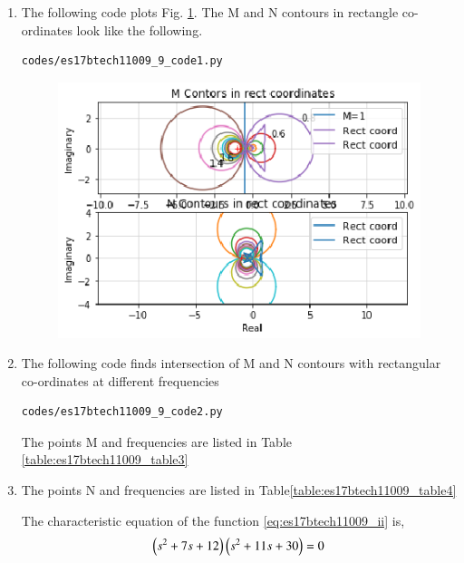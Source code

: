 \begin{enumerate}[label=\thesection.\arabic*.,ref=\thesection.\theenumi]
\begin{figure}[!h]
\end{figure}
\item
The following code plots Fig. \ref{fig:es17btech11009_9_1}.
The M and N contours in rectangle co-ordinates look like the following.
\begin{lstlisting}
codes/es17btech11009_9_code1.py
\end{lstlisting}
\begin{figure}[!h]
\includegraphics[width=\columnwidth]{./figs/es17btech11009_9_fig1.eps}
\caption{}
\label{fig:es17btech11009_9_1}
\end{figure}
\item 
The following code finds intersection of M and N contours with rectangular co-ordinates at different frequencies
\begin{lstlisting}
codes/es17btech11009_9_code2.py
\end{lstlisting}
The points M and frequencies are listed in Table  \ref{table:es17btech11009_table3}
\begin{table}[!ht]
\centering

\caption{}
\label{table:es17btech11009_table3}
\end{table}
\item
The points N and frequencies are listed in Table\ref{table:es17btech11009_table4}
\begin{table}[!ht]
\centering

\caption{}
\label{table:es17btech11009_table4}
\end{table}
The characteristic equation of the function \eqref{eq:es17btech11009_ii} is,
\begin{align}
 \brak{s^2 + 7s + 12} \brak{s^2 + 11s + 30} = 0

\end{align}
\end{enumerate}
